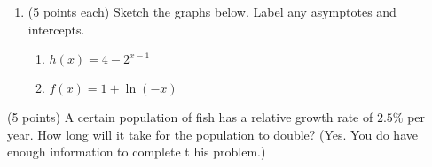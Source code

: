 \documentclass[12pt]{article}
\begin{document}
\begin{enumerate}
\item (5 points each) Sketch the graphs below. Label any asymptotes and intercepts.
\begin{enumerate}
\item 
\begin{minipage}[l]{7cm}
$h(x)=4-2^{x-1}$
\end{minipage}%
\begin{minipage}[c]{10cm}
\end{minipage}
\vfill
\item 
\begin{minipage}[t]{7cm}
$f(x)=1+\ln(-x)$\\
\end{minipage}%
\begin{minipage}[c]{10cm}
\end{minipage}
\end{enumerate}
\vfill
\end{enumerate}
{} (5 points) A certain population of fish has a relative growth rate of $2.5\%$ per year. How long will it take for the population to double? (Yes. You do have enough information to complete t his problem.)
\vspace{.6in}
\end{document}
